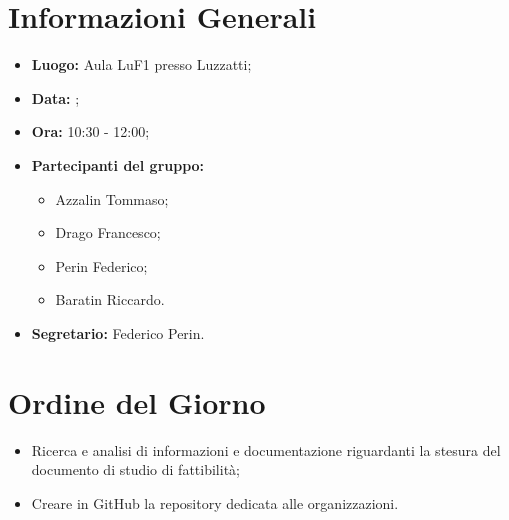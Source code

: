 \section{Informazioni Generali}
\begin{itemize}
\item \textbf{Luogo:} Aula LuF1 presso Luzzatti;
\item \textbf{Data:} \Data;
\item \textbf{Ora:} 10:30 - 12:00;
\item \textbf{Partecipanti del gruppo:}
	\begin{itemize}
	\item Azzalin Tommaso; 
	\item Drago Francesco;
	\item Perin Federico;
	\item Baratin Riccardo.
	\end{itemize} 
\item \textbf{Segretario:} Federico Perin.
\end{itemize}

\clearpage

\section{Ordine del Giorno}
\begin{itemize}
\item Ricerca e analisi di informazioni e documentazione riguardanti la stesura del documento di studio di fattibilità;
\item Creare in GitHub la repository dedicata alle organizzazioni.
\end{itemize}

\clearpage
